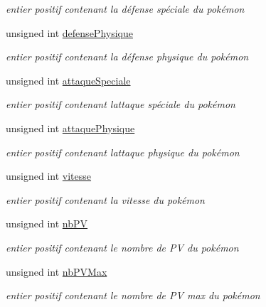 \begin{DoxyCompactItemize}
\begin{DoxyCompactList}\small\item\em entier positif contenant la défense spéciale du pokémon \end{DoxyCompactList}\item 
\mbox{\label{class_pokemon_a6ba9a414290c82370a265f68a7e0da6f}} 
unsigned int \hyperlink{class_pokemon_a6ba9a414290c82370a265f68a7e0da6f}{defense\+Physique}
\begin{DoxyCompactList}\small\item\em entier positif contenant la défense physique du pokémon \end{DoxyCompactList}\item 
\mbox{\label{class_pokemon_ace51c2fd6a66232e70c5a877cc48c72c}} 
unsigned int \hyperlink{class_pokemon_ace51c2fd6a66232e70c5a877cc48c72c}{attaque\+Speciale}
\begin{DoxyCompactList}\small\item\em entier positif contenant l\textquotesingle{}attaque spéciale du pokémon \end{DoxyCompactList}\item 
\mbox{\label{class_pokemon_a147d68da1bc4e822840560cb91940b4f}} 
unsigned int \hyperlink{class_pokemon_a147d68da1bc4e822840560cb91940b4f}{attaque\+Physique}
\begin{DoxyCompactList}\small\item\em entier positif contenant l\textquotesingle{}attaque physique du pokémon \end{DoxyCompactList}\item 
\mbox{\label{class_pokemon_ad115734dea9e1f27afb693c06bb9d41f}} 
unsigned int \hyperlink{class_pokemon_ad115734dea9e1f27afb693c06bb9d41f}{vitesse}
\begin{DoxyCompactList}\small\item\em entier positif contenant la vitesse du pokémon \end{DoxyCompactList}\item 
\mbox{\label{class_pokemon_a67d3d4e657454325695d19c50539a773}} 
unsigned int \hyperlink{class_pokemon_a67d3d4e657454325695d19c50539a773}{nb\+PV}
\begin{DoxyCompactList}\small\item\em entier positif contenant le nombre de PV du pokémon \end{DoxyCompactList}\item 
\mbox{\label{class_pokemon_ab2185ee35df1099c7aed7e2f4c1b1f69}} 
unsigned int \hyperlink{class_pokemon_ab2185ee35df1099c7aed7e2f4c1b1f69}{nb\+P\+V\+Max}
\begin{DoxyCompactList}\small\item\em entier positif contenant le nombre de PV max du pokémon \end{DoxyCompactList}\end{DoxyCompactItemize}


